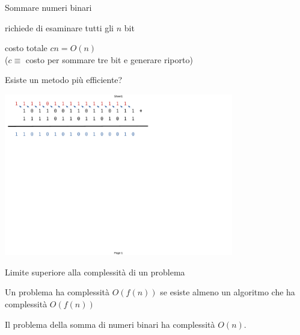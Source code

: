 \begin{frame}{Sommare numeri binari}

\vspace{-9pt}
\begin{myboxtitle}
\BI
\item richiede di esaminare tutti gli $n$ bit
\item costo totale $cn = O(n)$ \\
  ($c \equiv$ costo per sommare tre bit e generare riporto)
\EI
\end{myboxtitle}

\begin{myboxtitle}[Domanda]
Esiste un metodo più efficiente?
\end{myboxtitle}

\begin{center}
\includegraphics[width=10cm]{sum.pdf}
\end{center}

\end{frame}

\begin{frame}{Limite superiore alla complessità di un problema}

\vspace{-9pt}
\begin{myboxtitle}
Un problema ha complessità $O(f(n))$ se esiste almeno un algoritmo
che ha complessità $O(f(n))$
\end{myboxtitle}

\bigskip
\begin{myboxtitle}
Il problema della somma di numeri binari ha complessità $O(n)$.
\end{myboxtitle}



\end{frame}



